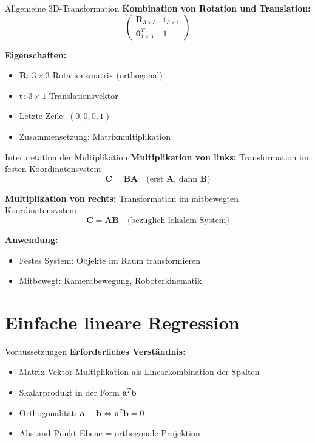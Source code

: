 \documentclass[a4paper, fontsize=7pt]{scrartcl}
\begin{document}
\begin{subbox}{Allgemeine 3D-Transformation}
\textbf{Kombination von Rotation und Translation:}
$$\begin{pmatrix}
\mathbf{R}_{3 \times 3} & \mathbf{t}_{3 \times 1} \\
\mathbf{0}^T_{1 \times 3} & 1
\end{pmatrix}$$

\textbf{Eigenschaften:}
\begin{itemize}
    \item $\mathbf{R}$: $3 \times 3$ Rotationsmatrix (orthogonal)
    \item $\mathbf{t}$: $3 \times 1$ Translationsvektor
    \item Letzte Zeile: $(0, 0, 0, 1)$
    \item Zusammensetzung: Matrixmultiplikation
\end{itemize}
\end{subbox}

\begin{subbox}{Interpretation der Multiplikation}
\textbf{Multiplikation von links:} Transformation im festen Koordinatensystem
$$\mathbf{C} = \mathbf{BA} \quad \text{(erst } \mathbf{A}\text{, dann } \mathbf{B}\text{)}$$

\textbf{Multiplikation von rechts:} Transformation im mitbewegten Koordinatensystem
$$\mathbf{C} = \mathbf{AB} \quad \text{(bezüglich lokalem System)}$$

\textbf{Anwendung:}
\begin{itemize}
    \item Festes System: Objekte im Raum transformieren
    \item Mitbewegt: Kamerabewegung, Roboterkinematik
\end{itemize}
\end{subbox}

\section{Einfache lineare Regression}

\begin{mainbox}{Voraussetzungen}
\textbf{Erforderliches Verständnis:}
\begin{itemize}
    \item Matrix-Vektor-Multiplikation als Linearkombination der Spalten
    \item Skalarprodukt in der Form $\mathbf{a}^T\mathbf{b}$
    \item Orthogonalität: $\mathbf{a} \perp \mathbf{b} \Leftrightarrow \mathbf{a}^T\mathbf{b} = 0$
    \item Abstand Punkt-Ebene = orthogonale Projektion
\end{itemize}
\end{mainbox}
\end{document}

